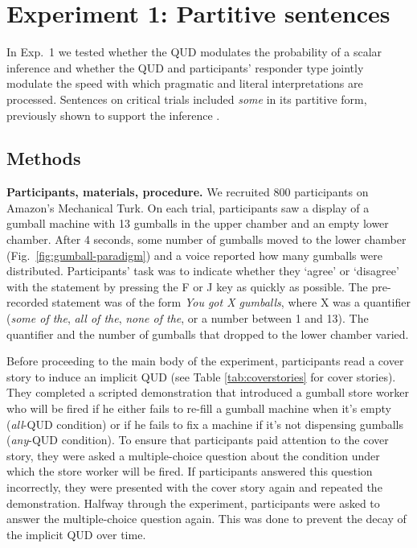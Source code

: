\documentclass[10pt,letterpaper]{article}
\begin{document}
\section{Experiment 1: Partitive sentences}

In Exp.~1 we tested whether the QUD  modulates the probability of a scalar inference and whether the QUD and participants' responder type jointly modulate the speed with which pragmatic and literal interpretations are processed. Sentences on critical trials included \emph{some} in its partitive form, previously shown to support the inference \cite{Degen2015}.


\subsection{Methods}

\noindent \textbf{Participants, materials, procedure.} We recruited 800 participants on Amazon's Mechanical Turk. %
On each trial, participants saw a display of a gumball machine with 13 gumballs in the upper chamber and an empty lower chamber. After 4 seconds, some number of gumballs moved to the lower chamber (Fig.~\ref{fig:gumball-paradigm}) and a voice reported how many gumballs were distributed. Participants' task was to indicate whether they `agree' or `disagree' with the statement by pressing the F or J key as quickly as possible. The pre-recorded statement was of the form \emph{You got X gumballs}, where X was a quantifier (\textit{some of the},  \textit{all of the}, \textit{none of the}, or a number between 1 and 13). The quantifier and the number of gumballs that dropped to the lower chamber varied.
  
Before proceeding to the main body of the experiment, participants read a cover story to induce an implicit QUD (see Table \ref{tab:coverstories} for cover stories). They completed a scripted demonstration that introduced a gumball store worker who will be fired if he either fails to re-fill a gumball machine when it's empty (\emph{all}-QUD condition) or if he fails to fix a machine if it's not dispensing gumballs (\emph{any}-QUD condition). To ensure that participants paid attention to the cover story, they were asked a multiple-choice question about the condition under which the store worker will be fired. If participants answered this question incorrectly, they were presented with the cover story again and repeated the demonstration. Halfway through the experiment, participants were asked to answer the multiple-choice question again. This was done to prevent the decay of the implicit QUD over time.  
 
\end{document}
